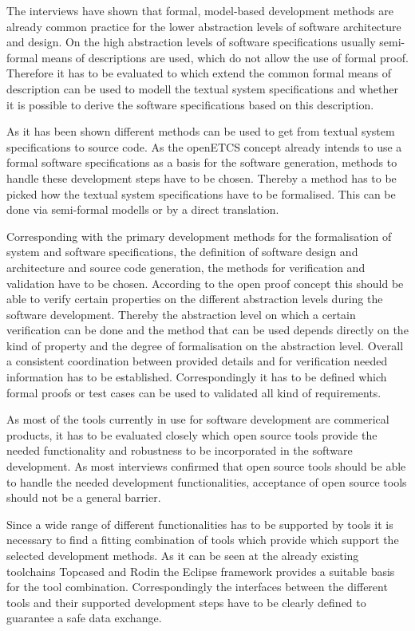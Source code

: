 \documentclass{./template/openetcs2}
\begin{document}
The interviews have shown that formal, model-based development methods are already common practice for the lower abstraction levels of software architecture and design. On the high abstraction levels of  software specifications usually semi-formal means of descriptions are used, which do not allow the use of formal proof. Therefore it has to be evaluated to which extend the common formal means of description can be used to modell the textual system specifications and whether it is possible to derive the software specifications based on this description. 

As it has been shown different methods can be used to get from textual system specifications to source code. As the openETCS concept already intends to use a formal software specifications as a basis for the software generation, methods to handle these development steps have to be chosen. Thereby a method has to be picked how the textual system specifications have to be formalised. This can be done via semi-formal modells or by a direct translation. 

Corresponding with the primary development methods for the formalisation of system and software specifications, the definition of software design and architecture and source code generation, the methods for verification and validation have to be chosen. According to the open proof concept this should be able to verify certain properties on the different abstraction levels during the software development. Thereby the abstraction level on which a certain verification can be done and the method that can be used depends directly on the kind of property and the degree of formalisation on the abstraction level. Overall a consistent coordination between provided details and for verification needed information has to be established. Correspondingly it has to be defined which formal proofs or test cases can be used to validated all kind of requirements.

As most of the tools currently in use for software development are commerical products, it has to be evaluated closely which open source tools provide the needed functionality and  robustness to be incorporated in the software development. As most interviews confirmed that open source tools should be able to handle the needed development functionalities, acceptance of open source tools should not be a general barrier. 

Since a wide range of different functionalities has to be supported by tools it is necessary to find a fitting combination of tools which provide which support the selected development methods. As it can be seen at the already existing toolchains Topcased and Rodin the Eclipse framework provides a suitable basis for the tool combination. Correspondingly the interfaces between the different tools and their supported development steps have to be clearly defined to guarantee a safe data exchange.
\end{document}
